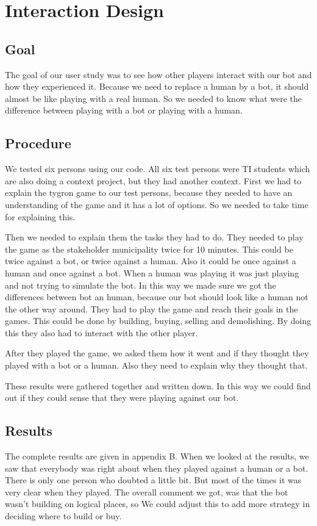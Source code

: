 \section{Interaction Design}

\subsection{Goal}
The goal of our user study was to see how other players interact with our bot and how they experienced it. Because we need to replace a human by a bot, it should almost be like playing with a real human. So we needed to know what were the difference between playing with a bot or playing with a human.

\subsection{Procedure}
We tested six persons using our code.  All six test persons were TI students which are also doing a context project, but they had another context.  
First we had to explain the tygron game to our test persons, because they needed to have an understanding of the game and it has a lot of options. So we needed to take time for explaining this. 

Then we needed to explain them the tasks they had to do. They needed to play the game as the stakeholder municipality twice for 10 minutes. This could be twice against a bot, or twice against a human. Also it could be once against a human and once against a bot. When a human was playing it was just playing and not trying to simulate the bot. In this way we made sure we got the differences between bot an human, because our bot should look like a human not the other way around. They had to play the game and reach their goals in the games. This could be done by building, buying, selling and demolishing. By doing this they also had to interact with the other player. 

After they played the game, we asked them how it went and if they thought they played with a bot or a human. Also they need to explain why they thought that. 

These results were gathered together and written down. In this way we could find out if they could sense that they were playing against our bot.

\subsection{Results}
The complete results are given in appendix B.
When we looked at the results, we saw that everybody was right about when they played against a human or a bot. There is only one person who doubted a little bit. But most of the times it was very clear when they played. The overall comment we got, was that the bot wasn't building on logical places, so We could adjust this to add more strategy in deciding where to build or buy. 

